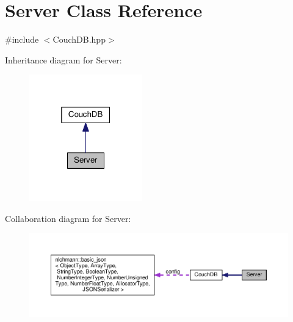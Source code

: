 \hypertarget{class_server}{}\section{Server Class Reference}
\label{class_server}


{\ttfamily \#include $<$Couch\+D\+B.\+hpp$>$}



Inheritance diagram for Server\+:\nopagebreak
\begin{figure}[H]
\begin{center}
\leavevmode
\includegraphics[width=139pt]{class_server__inherit__graph}
\end{center}
\end{figure}


Collaboration diagram for Server\+:\nopagebreak
\begin{figure}[H]
\begin{center}
\leavevmode
\includegraphics[width=350pt]{class_server__coll__graph}
\end{center}
\end{figure}
